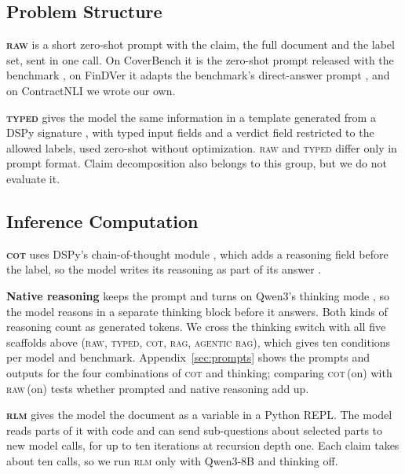 \documentclass[11pt]{article}
\newcommand{\typed}{\textsc{typed}}
\begin{document}
\subsection{Problem Structure}
\label{sec:problem-structure}

\noindent \textbf{\textsc{raw}} is a short zero-shot prompt with the
claim, the full document and the label set, sent in one call. On
CoverBench it is the zero-shot prompt released with the benchmark
\citep{jacovi2024coverbench}, on FinDVer it adapts the benchmark's
direct-answer prompt \citep{zhao-etal-2024-findver}, and on ContractNLI we
wrote our own.

\noindent \textbf{\typed{}} gives the model the same information in a
template generated from a DSPy signature \citep{khattab2023dspy}, with
typed input fields and a verdict field restricted to the allowed labels,
used zero-shot without optimization. \textsc{raw} and \typed{} differ only
in prompt format. Claim decomposition also belongs to this group, but we
do not evaluate it.

\subsection{Inference Computation}
\label{sec:inference-computation}

\noindent \textbf{\textsc{cot}} uses DSPy's chain-of-thought module
\citep{khattab2023dspy}, which adds a reasoning field before the label, so
the model writes its reasoning as part of its answer
\citep{kojima2022zeroshot, wei2022cot}.

\noindent \textbf{Native reasoning} keeps the prompt and turns on Qwen3's
thinking mode \citep{yang2025qwen3}, so the model reasons in a separate
thinking block before it answers. Both kinds of reasoning count as
generated tokens. We cross the thinking switch with all five scaffolds
above (\textsc{raw}, \typed{}, \textsc{cot}, \textsc{rag}, \textsc{agentic
rag}), which gives ten conditions per model and benchmark.
Appendix~\ref{sec:prompts} shows the prompts and outputs for the four
combinations of \textsc{cot} and thinking; comparing \textsc{cot}\,(on)
with \textsc{raw}\,(on) tests whether prompted and native reasoning add up.

\noindent \textbf{\textsc{rlm}} \citep{zhang2025rlm} gives the model the
document as a variable in a Python REPL. The model reads parts of it with
code and can send sub-questions about selected parts to new model calls,
for up to ten iterations at recursion depth one. Each claim takes about
ten calls, so we run \textsc{rlm} only with Qwen3-8B and thinking off.
\end{document}
